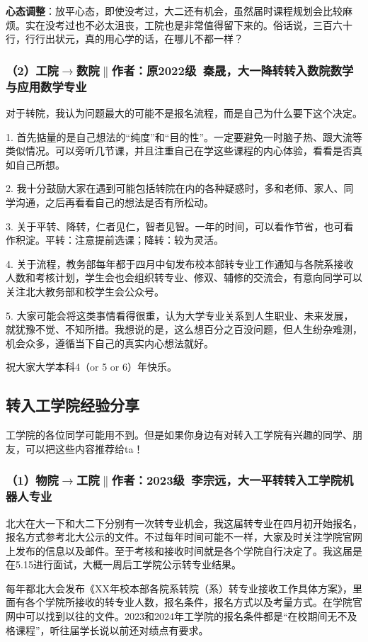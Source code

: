 \documentclass[11pt,oneside]{book}
\begin{document}
\textbf{心态调整}：放平心态，即使没考过，大二还有机会，虽然届时课程规划会比较麻烦。实在没考过也不必太沮丧，工院也是非常值得留下来的。俗话说，三百六十行，行行出状元，真的用心学的话，在哪儿不都一样？

\subsubsection{（2）工院$\to$数院$\parallel$作者：原2022级\ 秦晟，大一降转转入数院数学与应用数学专业}
对于转院，我认为问题最大的可能不是报名流程，而是自己为什么要下这个决定。

1. 首先掂量的是自己想法的“纯度”和“目的性”。一定要避免一时脑子热、跟大流等类似情况。可以旁听几节课，并且注重自己在学这些课程的内心体验，看看是否真如自己所想。

2. 我十分鼓励大家在遇到可能包括转院在内的各种疑惑时，多和老师、家人、同学沟通，之后再看看自己的想法是否有所松动。

3. 关于平转、降转，仁者见仁，智者见智。一年的时间，可以看作节省，也可看作积淀。平转：注意提前选课；降转：较为灵活。

4. 关于流程，教务部每年都于四月中旬发布校本部转专业工作通知与各院系接收人数和考核计划，学生会也会组织转专业、修双、辅修的交流会，有意向同学可以关注北大教务部和校学生会公众号。

5. 大家可能会将这类事情看得很重，认为大学专业关系到人生职业、未来发展，就犹豫不觉、不知所措。我想说的是，这么想百分之百没问题，但人生纷杂难测，机会众多，遵循当下自己的真实内心想法就好。

祝大家大学本科4（or 5 or 6）年快乐。


\subsection{转入工学院经验分享}
工学院的各位同学可能用不到。但是如果你身边有对转入工学院有兴趣的同学、朋友，可以把这些内容推荐给ta！
\subsubsection{（1）物院$\to$工院$\parallel$作者：2023级\ 李宗远，大一平转转入工学院机器人专业}
北大在大一下和大二下分别有一次转专业机会，我这届转专业在四月初开始报名，报名方式参考北大公示的文件。不过每年时间可能不一样，大家及时关注学院官网上发布的信息以及邮件。至于考核和接收时间就是各个学院自行决定了。我这届是在5.15进行面试，大概一周后工学院公示转专业结果。

每年都北大会发布《XX年校本部各院系转院（系）转专业接收工作具体方案》，里面有各个学院所接收的转专业人数，报名条件，报名方式以及考量方式。在学院官网中可以找到以往的文件。2023和2024年工学院的报名条件都是“在校期间无不及格课程”，听往届学长说以前还对绩点有要求。
\end{document}
